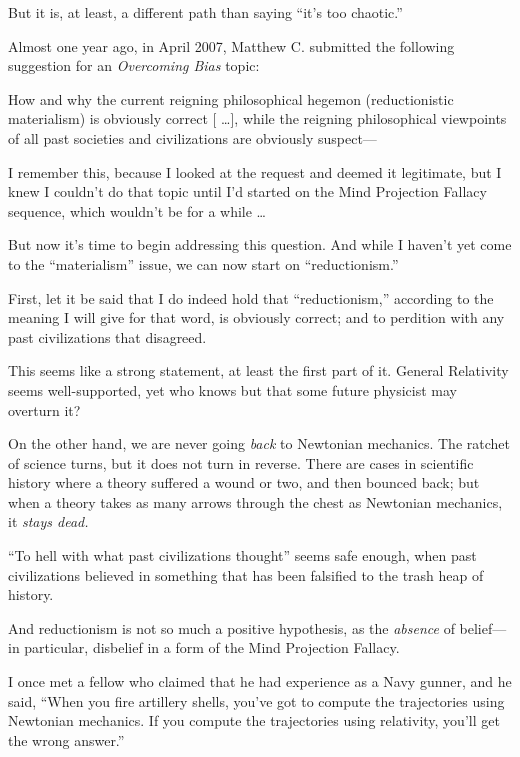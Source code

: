 {
 But it is, at least, a different path than saying
``it's too
chaotic.''}

\myendsectiontext


{
 Almost one year ago, in April 2007, Matthew C. submitted the
following suggestion for an \textit{Overcoming Bias} topic:}

{
 How and why the current reigning philosophical hegemon
(reductionistic materialism) is obviously correct [ \ldots ], while the
reigning philosophical viewpoints of all past societies and
civilizations are obviously suspect---}

{
 I remember this, because I looked at the request and deemed it
legitimate, but I knew I couldn't do that topic until
I'd started on the Mind Projection Fallacy sequence,
which wouldn't be for a while \ldots}

{
 But now it's time to begin addressing this
question. And while I haven't yet come to the
``materialism'' issue, we can now
start on ``reductionism.''}

{
 First, let it be said that I do indeed hold that
``reductionism,'' according to the
meaning I will give for that word, is obviously correct; and to
perdition with any past civilizations that disagreed.}

{
 This seems like a strong statement, at least the first part of it.
General Relativity seems well-supported, yet who knows but that some
future physicist may overturn it?}

{
 On the other hand, we are never going \textit{back} to Newtonian
mechanics. The ratchet of science turns, but it does not turn in
reverse. There are cases in scientific history where a theory suffered
a wound or two, and then bounced back; but when a theory takes as many
arrows through the chest as Newtonian mechanics, it \textit{stays
dead.}}

{
 ``To hell with what past civilizations
thought'' seems safe enough, when past civilizations
believed in something that has been falsified to the trash heap of
history.}

{
 And reductionism is not so much a positive hypothesis, as the
\textit{absence} of belief---in particular, disbelief in a form of the
Mind Projection Fallacy.}

{
 I once met a fellow who claimed that he had experience as a Navy
gunner, and he said, ``When you fire artillery shells,
you've got to compute the trajectories using Newtonian
mechanics. If you compute the trajectories using relativity,
you'll get the wrong answer.''}

